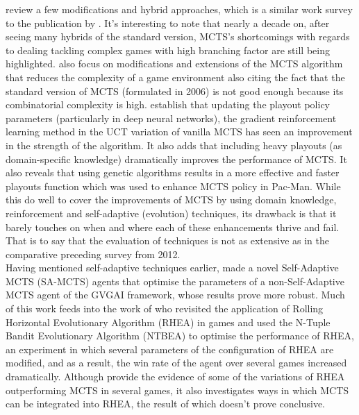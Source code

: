 \documentclass{llncs}
\begin{document}
\noindent
\cite{swiechowski2021monte} review a few modifications and hybrid approaches, which is a similar work survey to the publication by \cite{Browne2012}. It's interesting to note that nearly a decade on, after seeing many hybrids of the standard version, MCTS’s shortcomings with regards to dealing tackling complex games with high branching factor are still being highlighted. \cite{swiechowski2021monte} also focus on modifications and extensions of the MCTS algorithm that reduces the complexity of a game  environment also citing the fact that the standard version of MCTS (formulated in 2006) is not good enough because its combinatorial complexity is high. \cite{swiechowski2021monte} establish that updating the playout policy parameters (particularly in deep neural networks), the gradient reinforcement learning method in the UCT variation of vanilla MCTS has seen an improvement in the strength of the algorithm. It also adds that including heavy playouts (as domain-specific knowledge) dramatically improves the performance of MCTS. It also reveals that using genetic algorithms results in a more effective and faster playouts function which was used to enhance MCTS policy in Pac-Man. While this \cite{swiechowski2021monte} do well to cover the improvements of MCTS by using domain knowledge, reinforcement and self-adaptive (evolution) techniques, its drawback is that it barely touches on when and where each of these enhancements thrive and fail. That is to say that the evaluation of techniques is not as extensive as in the comparative preceding survey from 2012.\\

\noindent
Having mentioned self-adaptive techniques earlier, \cite{sironi2018self} made a novel Self-Adaptive MCTS (SA-MCTS) agents that optimise the parameters of a non-Self-Adaptive MCTS agent of the GVGAI framework, whose results prove more robust. Much of this work feeds into the work of \cite{gaina2021rolling} who revisited the application of Rolling Horizontal Evolutionary Algorithm (RHEA) in games and used the N-Tuple Bandit Evolutionary Algorithm (NTBEA) to optimise the performance of RHEA, an experiment in which several parameters of the configuration of RHEA are modified, and as a result, the win rate of the agent over several games increased dramatically. Although \cite{sironi2018self} provide the evidence of some of the variations of RHEA outperforming MCTS in several games, it also investigates ways in which MCTS can be integrated into RHEA, the result of which doesn't prove conclusive. \\
\end{document}
